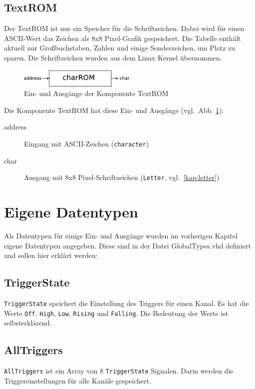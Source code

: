 \documentclass[IN,ngerman,utf8,12pt]{tumbook}
\newcommand{\vgl}{vgl.\ }
\begin{document}
\subsection{TextROM}

Der TextROM ist nur ein Speicher für die Schriftzeichen.
Dabei wird für einen ASCII-Wert das Zeichen als 8x8 Pixel-Grafik gespeichert.
Die Tabelle enthält aktuell nur Großbuchstaben, Zahlen und einige Sonderzeichen, um Platz zu sparen.
Die Schriftzeichen wurden aus dem Linux Kernel übernommen.

\begin{figure}[H]
    \centerline{
        \includegraphics[width=0.5\textwidth]{img/textROM}
    }
    \label{abb:textrom}
    \caption{Ein- und Ausgänge der Komponente TextROM}
\end{figure}

Die Komponente TextROM hat diese Ein- und Ausgänge (\vgl Abb. \ref{abb:textrom}):
\begin{description}
    \item[address] Eingang mit ASCII-Zeichen (\texttt{character})
    \item[char] Ausgang mit 8x8 Pixel-Schriftzeichen (\texttt{Letter}, \vgl \ref{kap:letter})
\end{description}

\section{Eigene Datentypen}
Als Datentypen für einige Ein- und Ausgänge wurden im vorherigen Kapitel eigene Datentypen angegeben.
Diese sind in der Datei GlobalTypes.vhd definiert und sollen hier erklärt werden:

\subsection{TriggerState}
\label{kap:triggerstate}
\texttt{TriggerState} speichert die Einstellung des Triggers für einen Kanal.
Es hat die Werte \texttt{Off}, \texttt{High}, \texttt{Low}, \texttt{Rising} und \texttt{Falling}.
Die Bedeutung der Werte ist selbsterklärend.

\subsection{AllTriggers}
\label{kap:alltriggers}
\texttt{AllTriggers} ist ein Array von 8 \texttt{TriggerState} Signalen.
Darin werden die Triggereinstellungen für alle Kanäle gespeichert.
\end{document}
